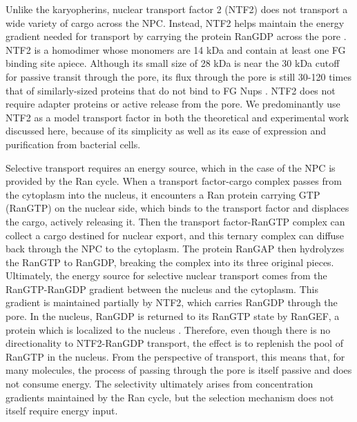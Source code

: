 Unlike the karyopherins, nuclear transport factor 2 (NTF2) does not transport a wide variety of cargo across the NPC.  Instead, NTF2 helps maintain the energy gradient needed for transport by carrying the protein RanGDP across the pore \cite{ribbeck98,bayliss99}.  NTF2 is a homodimer whose monomers are 14 kDa and contain at least one FG binding site apiece.  Although its small size of 28 kDa is near the 30 kDa cutoff for passive transit through the pore, its flux through the pore is still 30-120 times that of similarly-sized proteins that do not bind to FG Nups \cite{ribbeck01,siebrasse02,kiskin03}.  NTF2 does not require adapter proteins or active release from the pore. We predominantly use NTF2 as a model transport factor in both the theoretical and experimental work discussed here, because of its simplicity as well as its ease of expression and purification from bacterial cells.

Selective transport requires an energy source, which in the case of the NPC is provided by the Ran cycle.  When a transport factor-cargo complex passes from the cytoplasm into the nucleus, it encounters a Ran protein carrying GTP  (RanGTP) on the nuclear side, which binds to the transport factor and displaces the cargo, actively releasing it.  Then the transport factor-RanGTP complex can collect a cargo destined for nuclear export, and this ternary complex can diffuse back through the NPC to the cytoplasm.  The protein RanGAP then hydrolyzes the RanGTP to RanGDP, breaking the complex into its three original pieces.  Ultimately, the energy source for selective nuclear transport comes from the RanGTP-RanGDP gradient between the nucleus and the cytoplasm.  This gradient is maintained partially by NTF2, which carries RanGDP through the pore.  In the nucleus, RanGDP is returned to its RanGTP state by RanGEF, a protein which is localized to the nucleus \cite{ribbeck98,jovanovic-talisman17,stanley17}. Therefore, even though there is no directionality to NTF2-RanGDP transport, the effect is to replenish the pool of RanGTP in the nucleus. From the perspective of transport, this means that, for many molecules, the process of passing through the pore is itself passive and does not consume energy.  The selectivity ultimately arises from concentration gradients maintained by the Ran cycle, but the selection mechanism does not itself require energy input.

